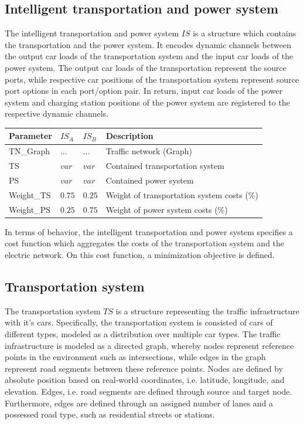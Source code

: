 \subsection{Intelligent transportation and power system}

The intelligent transportation and power system $IS$ is a structure which contains the transportation and the power system. It encodes dynamic channels between the output car loads of the transportation system and the input car loads of the power system. The output car loads of the transportation represent the source ports, while respective car positions of the transportation system represent source port options in each port/option pair. In return, input car loads of the power system and charging station positions of the power system are registered to the respective dynamic channels. 

\begin{table}[h]
	\renewcommand{\arraystretch}{1.3}
	\centering
	\begin{tabular}{llll}
		\hline
		\textbf{Parameter}     & \textbf{$IS_{A}$} & \textbf{$IS_{B}$}       & \textbf{Description} \\ \hline
		TN\_Graph               & $...$ & $...$  	  & Traffic network (Graph)     \\
		TS     & $var$   & $var$ 	  & Contained transportation system     \\
		PS               & $var$ 	 & $var$ & Contained power system    \\
		Weight\_TS               & $0.75$  & $0.25$ & Weight of transportation system costs (\%)       \\ 
		Weight\_PS               & $0.25$  & $0.75$  		  & Weight of power system costs (\%)   \\ \hline
	\end{tabular}
\end{table}

In terms of behavior, the intelligent transportation and power system specifies a cost function which aggregates the costs of the transportation system and the electric network. On this cost function, a minimization objective is defined.

\subsection{Transportation system}

The transportation system $TS$ is a structure representing the traffic infrastructure with it's cars. Specifically, the transportation system is consisted of cars of different types, modeled as a distribution over multiple car types. The traffic infrastructure is modeled as a directed graph, whereby nodes represent reference points in the environment such as intersections, while edges in the graph represent road segments between these reference points. Nodes are defined by absolute position based on real-world coordinates, i.e. latitude, longitude, and elevation. Edges, i.e. road segments are defined through source and target node. Furthermore, edges are defined through an assigned number of lanes and a possessed road type, such as residential streets or stations.


